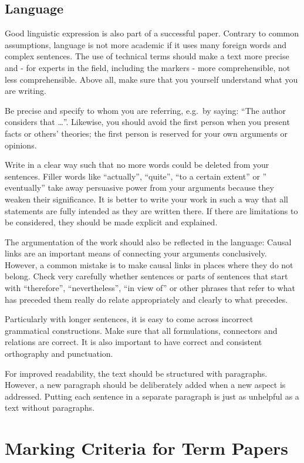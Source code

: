 \documentclass[
  english,
]{scrreprt}
\begin{document}
\subsection{Language}\label{language}

Good linguistic expression is also part of a successful paper. Contrary to common assumptions, language is not more academic if it uses many foreign words and complex sentences. The use of technical terms should make a text more precise and - for experts in the field, including the markers - more comprehensible, not less comprehensible. Above all, make sure that you yourself understand what you are writing.

Be precise and specify to whom you are referring, e.g.~by saying: “The author considers that …”. Likewise, you should avoid the first person when you present facts or others’ theories; the first person is reserved for your own arguments or opinions.

Write in a clear way such that no more words could be deleted from your sentences. Filler words like “actually”, “quite”, “to a certain extent” or ” eventually” take away persuasive power from your arguments because they weaken their significance. It is better to write your work in such a way that all statements are fully intended as they are written there. If there are limitations to be considered, they should be made explicit and explained.

The argumentation of the work should also be reflected in the language: Causal links are an important means of connecting your arguments conclusively. However, a common mistake is to make causal links in places where they do not belong. Check very carefully whether sentences or parts of sentences that start with “therefore”, “nevertheless”, “in view of” or other phrases that refer to what has preceded them really do relate appropriately and clearly to what precedes.

Particularly with longer sentences, it is easy to come across incorrect grammatical constructions. Make sure that all formulations, connectors and relations are correct. It is also important to have correct and consistent orthography and punctuation.

For improved readability, the text should be structured with paragraphs. However, a new paragraph should be deliberately added when a new aspect is addressed. Putting each sentence in a separate paragraph is just as unhelpful as a text without paragraphs.

\section{Marking Criteria for Term Papers}\label{sec:marking}
\end{document}
